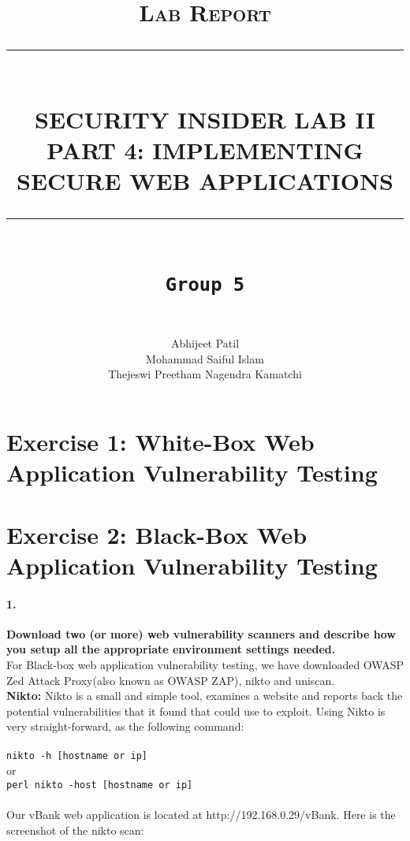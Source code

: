 \documentclass[12pt]{report}
\newcommand{\HRule}[1]{\rule{\linewidth}{#1}}
\begin{document}
	
	\title{ \normalsize \textsc{Lab Report}
		\\ [2.0cm]
		\HRule{0.5pt} \\
		\LARGE \textbf{\uppercase{Security Insider Lab II \\
				Part 4: Implementing Secure Web Applications}}
		\HRule{2pt} \\ [0.5cm]
		\normalsize \vspace*{4\baselineskip}
		\LARGE {\tt Group 5}\\}
	\date{}
	\author{
		 \\
		Abhijeet Patil \\
		Mohammad Saiful Islam\\
		Thejeswi Preetham Nagendra Kamatchi}
	\maketitle
	\newpage
	
	
	\section*{Exercise 1: White-Box Web Application Vulnerability Testing}
	\newpage
	
	\section*{Exercise 2: Black-Box Web Application Vulnerability Testing}
	
	\paragraph*{1.}{\bf Download two (or more) web vulnerability scanners and describe how you setup all the appropriate environment settings needed.}\\
	
	For Black-box web application vulnerability testing, we have downloaded OWASP Zed Attack Proxy(also known as OWASP ZAP), nikto and uniscan.\\
	
	{\bf Nikto:} Nikto is a small and simple tool, examines a website and reports back the potential vulnerabilities that it found that could use to exploit. Using Nikto is very straight-forward, as the following command:\\\\
	{\tt nikto -h [hostname or ip]}
	\\or\\
	{\tt perl nikto -host [hostname or ip]}
	\\\\Our vBank web application is located at {\sf http://192.168.0.29/vBank}. Here is the screenshot of the nikto scan:
	
\end{document}
